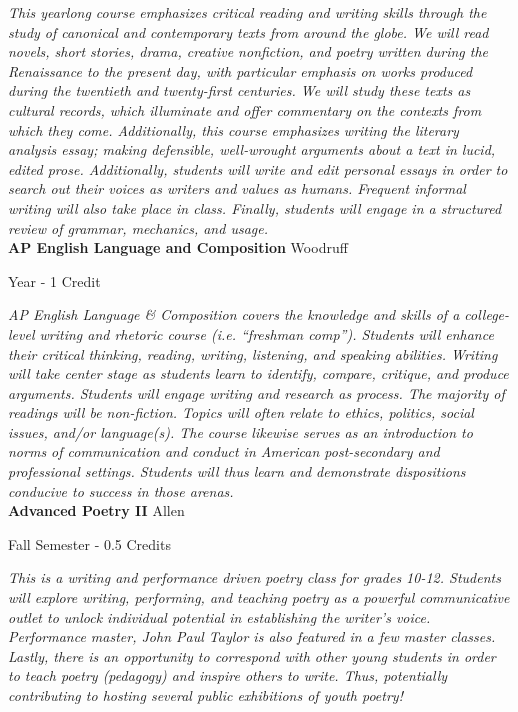 \vspace{1mm}\emph{This yearlong course emphasizes critical reading and writing skills through the study of canonical and contemporary texts from around the globe. We will read novels, short stories, drama, creative nonfiction, and poetry written during the Renaissance to the present day, with particular emphasis on works produced during the twentieth and twenty-first centuries. We will study these texts as cultural records, which illuminate and offer commentary on the contexts from which they come. Additionally, this course emphasizes writing the literary analysis essay; making defensible, well-wrought arguments about a text in lucid, edited prose. Additionally, students will write and edit personal essays in order to search out their voices as writers and values as humans. Frequent informal writing will also take place in class. Finally, students will engage in a structured review of grammar, mechanics, and usage. }\\

\noindent\textbf{AP English Language and Composition} \hfill Woodruff

\noindent Year - 1 Credit

\vspace{1mm}\emph{AP English Language \& Composition covers the knowledge and skills of a college-level writing and rhetoric course (i.e. “freshman comp”). Students will enhance their critical thinking, reading, writing, listening, and speaking abilities. Writing will take center stage as students learn to identify, compare, critique, and produce arguments. Students will engage writing and research as process. The majority of readings will be non-fiction. Topics will often relate to ethics, politics, social issues, and/or language(s). The course likewise serves as an introduction to norms of communication and conduct in American post-secondary and professional settings. Students will thus learn and demonstrate dispositions conducive to success in those arenas.}\\

\noindent\textbf{Advanced Poetry II} \hfill Allen

\noindent Fall Semester - 0.5 Credits

\vspace{1mm}\emph{This is a writing and performance driven poetry class for grades 10-12. Students will explore writing, performing, and teaching poetry as a powerful communicative outlet to unlock individual potential in establishing the writer’s voice. Performance master, John Paul Taylor is also featured in a few master classes. Lastly, there is an opportunity to correspond with other young students in order to teach poetry (pedagogy) and inspire others to write. Thus, potentially contributing to hosting several public exhibitions of youth poetry!}\\

